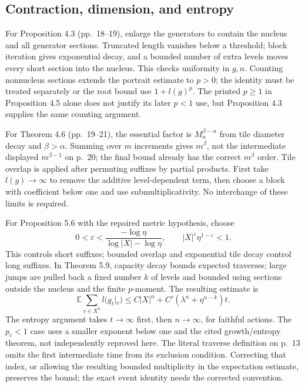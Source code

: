 \documentclass[10pt]{article}
\begin{document}
\subsection*{Contraction, dimension, and entropy}
For Proposition 4.3 (pp. 18–19), enlarge the generators to contain the nucleus and all generator sections. Truncated length vanishes below a threshold; block iteration gives exponential decay, and a bounded number of extra levels moves every short section into the nucleus. This checks uniformity in \(g,n\). Counting nonnucleus sections extends the portrait estimate to \(p>0\); the identity must be treated separately or the root bound use \(1+l(g)^p\). The printed \(p\ge1\) in Proposition 4.5 alone does not justify its later \(p<1\) use, but Proposition 4.3 supplies the same counting argument.\par
For Theorem 4.6 (pp. 19–21), the essential factor is \(M_n^{\beta-\alpha}\) from tile diameter decay and \(\beta>\alpha\). Summing over \(m\) increments gives \(m^\beta\), not the intermediate displayed \(m^{\beta-1}\) on p. 20; the final bound already has the correct \(m^\beta\) order. Tile overlap is applied after permuting suffixes by partial products. First take \(l(g)\to\infty\) to remove the additive level-dependent term, then choose a block with coefficient below one and use submultiplicativity. No interchange of these limits is required.\par
For Proposition 5.6 with the repaired metric hypothesis, choose \[0<\varepsilon<\frac{-\log\eta}{\log|X|-\log\eta},
 \qquad |X|^\varepsilon\eta^{1-\varepsilon}<1.\] This controls short suffixes; bounded overlap and exponential tile decay control long suffixes. In Theorem 5.9, capacity decay bounds expected traverses; large jumps are pulled back a fixed number \(k\) of levels and bounded using sections outside the nucleus and the finite \(p\)-moment. The resulting estimate is \[\mathbb E\sum_{v\in X^n}l(g_t|_v)
 \le C|X|^n+C'(\lambda^n+\eta^{n-k})t.\] The entropy argument takes \(t\to\infty\) first, then \(n\to\infty\), for faithful actions. The \(p_c<1\) case uses a smaller exponent below one and the cited growth/entropy theorem, not independently reproved here. The literal traverse definition on p. 13 omits the first intermediate time from its exclusion condition. Correcting that index, or allowing the resulting bounded multiplicity in the expectation estimate, preserves the bound; the exact event identity needs the corrected convention.\par
\end{document}
